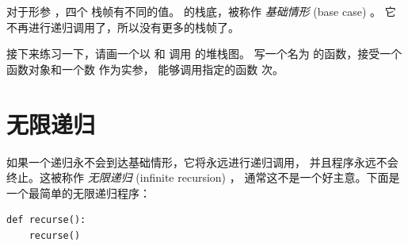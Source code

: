 {{{{%

对于形参  ，四个  栈帧有不同的值。  的栈底，被称作 {\em 基础情形} (base case) 。 它不再进行递归调用了，所以没有更多的栈帧了。


接下来练习一下，请画一个以  和  调用  的堆栈图。 写一个名为  的函数，接受一个函数对象和一个数  作为实参， 能够调用指定的函数  次。

\section{无限递归}

  
    

  
    


如果一个递归永不会到达基础情形，它将永远进行递归调用，
并且程序永远不会终止。这被称作 {\em 无限递归} (infinite recursion) ，
通常这不是一个好主意。下面是一个最简单的无限递归程序：

\begin{lstlisting}
def recurse():
    recurse()
\end{lstlisting}

%

}}}}
